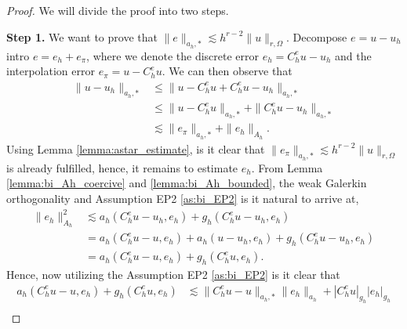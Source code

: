 \documentclass[11pt]{article}
\theoremstyle{remark}
\newcommand{\abs}[1]{\left\lvert #1 \right\rvert}
\renewcommand{\le}{\leqslant}
\numberwithin{equation}{section}
\begin{document}
\begin{proof}
    We will divide the proof into two steps.

        \textbf{Step 1.} We want to prove that $\| e \|_{ a_{h},* }^{  } \lesssim   h^{r-2} \| u \|_{ r,\Omega  }^{  }$.
    Decompose $e = u - u_{h}$ intro $e = e_{h} + e_{\pi }$, where we denote the discrete error $e_{h} = C _{h}^{e} u - u_{h}$ and the interpolation error $e_{\pi } = u - C _{h} ^{e}u$. We can then observe that
    \begin{equation}
        \label{eq:astar_est}
        \begin{split}
    \| u - u_{h} \|_{ a_{h},* }^{  } & \le   \| u - C_{h}^{e} u + C_{h}^{e}u - u_{h} \|_{ a_{h},* }^{  } \\
    & \le \|  u - C_{h}^{e} u \|_{a_{h},*  }^{  } +  \| C_{h}^{e}u - u_{h} \|_{a_{h},*  }^{  }\\
                                     & \lesssim  \| e_{\pi } \|_{a_{h},*}^{  } + \| e_{h} \|_{A_{h}  }^{  }.
        \end{split}
    \end{equation}
    Using Lemma \ref{lemma:astar_estimate}, is it clear that $\| e_{\pi } \|_{a_{h},*}^{  } \lesssim h^{r-2} \| u \|_{ r,\Omega  }^{  }  $ is already fulfilled, hence, it remains to estimate $e_{h}$. From Lemma \ref{lemma:bi_Ah_coercive} and
    \ref{lemma:bi_Ah_bounded}, the weak Galerkin orthogonality and Assumption EP2 \eqref{as:bi_EP2} is it natural to arrive at,
    \begin{equation}
        \label{eq:apriori_energy1}
    \begin{split}
\| e_{h} \|_{ A_{h} }^{ 2 } & \lesssim a_{h}( C _{h}^{e} u - u_{h}, e_{h}) + g_{h}( C _{h}^{e}u - u_{h}, e_{h}) \\
 & = a_{h}( C _{h}^{e} u - u, e_{h}) + a_{h}( u - u_{h}, e_{h}) + g_{h}( C _{h}^{e}u - u_{h}, e_{h}) \\
 & = a_{h}( C _{h}^{e} u - u, e_{h}) + g_{h}( C _{h}^{e}u, e_{h}).
    \end{split}
    \end{equation}
Hence, now utilizing the Assumption EP2 \eqref{as:bi_EP2} is it clear that
\begin{equation}
        \label{eq:apriori_energy2}
    \begin{split}
        a_{h}( C _{h}^{e} u - u, e_{h}) + g_{h}( C _{h}^{e}u, e_{h}) &\lesssim \| C _{h}^{e} u - u \|_{a_{h},*  }^{  } \| e_{h} \|_{a_{h}  }^{  }
        + \abs{ C _{h}^{e}u }_{g_{h}} \abs{e_{h}  }_{g_{h}} \\

\end{split}
\end{equation}
\end{proof}
\end{document}
